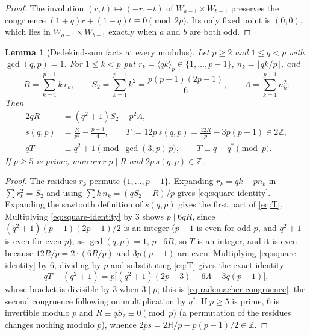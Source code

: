 \documentclass[11pt]{article}
\newtheorem{lemma}[theorem]{Lemma}
\theoremstyle{definition}
\newcommand{\Z}{\mathbb Z}
\begin{document}
\begin{proof}
The involution $(r,t)\mapsto(-r,-t)$ of $W_{a-1}\times W_{b-1}$ preserves
the congruence $(1+q)r+(1-q)t\equiv0\pmod{2p}$.  Its only fixed point is
$(0,0)$, which lies in $W_{a-1}\times W_{b-1}$ exactly when $a$ and $b$
are both odd.
\end{proof}

\begin{lemma}[Dedekind-sum facts at every modulus]
\label{lem:dedekind-facts}
Let $p\geq2$ and $1\leq q<p$ with $\gcd(q,p)=1$.  For $1\leq k<p$ put
$r_k=\langle qk\rangle_p\in\{1,\ldots,p-1\}$, $n_k=\lfloor qk/p\rfloor$,
and
\[
 R=\sum_{k=1}^{p-1}k\,r_k,\qquad
 S_2=\sum_{k=1}^{p-1}k^2=\frac{p(p-1)(2p-1)}6,\qquad
 \Lambda=\sum_{k=1}^{p-1}n_k^2 .
\]
Then
\begin{align}
 2qR&=(q^2+1)S_2-p^2\Lambda,\label{eq:square-identity}\\
 s(q,p)&=\frac R{p^2}-\frac{p-1}4,\qquad
 T:=12p\,s(q,p)=\frac{12R}p-3p(p-1)\in2\Z,\label{eq:T}\\
 qT&\equiv q^2+1\pmod{\gcd(3,p)\,p},\qquad
 T\equiv q+q^*\pmod p.\label{eq:rademacher-congruence}
\end{align}
If $p\geq5$ is prime, moreover $p\mid R$ and $2p\,s(q,p)\in\Z$.
\end{lemma}

\begin{proof}
The residues $r_k$ permute $\{1,\ldots,p-1\}$.  Expanding
$r_k=qk-pn_k$ in $\sum r_k^2=S_2$ and using $\sum k\,n_k=(qS_2-R)/p$
gives \eqref{eq:square-identity}.  Expanding the sawtooth definition of
$s(q,p)$ gives the first part of \eqref{eq:T}.  Multiplying
\eqref{eq:square-identity} by $3$ shows $p\mid6qR$, since
$(q^2+1)(p-1)(2p-1)/2$ is an integer ($p-1$ is even for odd $p$, and
$q^2+1$ is even for even $p$); as $\gcd(q,p)=1$, $p\mid6R$, so $T$ is an
integer, and it is even because $12R/p=2\cdot(6R/p)$ and $3p(p-1)$ are
even.  Multiplying \eqref{eq:square-identity} by $6$, dividing by $p$
and substituting \eqref{eq:T} gives the exact identity
\begin{equation}
 qT-(q^2+1)=p\bigl[(q^2+1)(2p-3)-6\Lambda-3q(p-1)\bigr],
 \label{eq:qT-identity}
\end{equation}
whose bracket is divisible by $3$ when $3\mid p$; this is
\eqref{eq:rademacher-congruence}, the second congruence following on
multiplication by $q^*$.  If $p\geq5$ is prime, $6$ is invertible modulo
$p$ and $R\equiv qS_2\equiv0\pmod p$ (a permutation of the residues
changes nothing modulo $p$), whence $2ps=2R/p-p(p-1)/2\in\Z$.
\end{proof}
\end{document}
